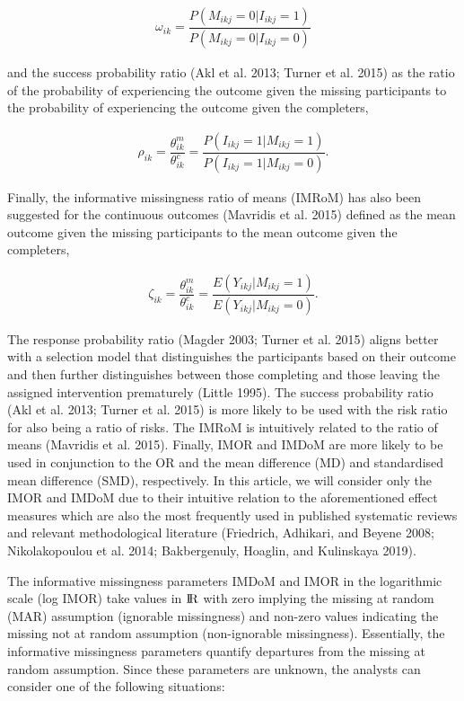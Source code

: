 \[\begin{aligned}
\omega_{ik} = \dfrac{P(M_{ikj} = 0 | I_{ikj} = 1)}{P(M_{ikj} = 0 | I_{ikj} = 0)}
\end{aligned}\]

and the success probability ratio (Akl et al. 2013; Turner et al. 2015) as the ratio of the
probability of experiencing the outcome given the missing participants to the
probability of experiencing the outcome given the completers,

\[\begin{aligned}
\rho_{ik} = \dfrac{\theta^{m}_{ik}}{\theta^{c}_{ik}} = \dfrac{P(I_{ikj} = 1 | M_{ikj} = 1)}{P(I_{ikj} = 1 | M_{ikj} = 0)}.
\end{aligned}\]

Finally, the informative missingness ratio of means (IMRoM) has also been suggested
for the continuous outcomes (Mavridis et al. 2015) defined as the mean outcome given the
missing participants to the mean outcome given the completers,

\[\begin{aligned}
\zeta_{ik} = \dfrac{\theta^{m}_{ik}}{\theta^{c}_{ik}} = \dfrac{E(Y_{ikj} | M_{ikj} = 1)}{E(Y_{ikj} | M_{ikj} = 0)}.
\end{aligned}\]

The response probability ratio (Magder 2003; Turner et al. 2015) aligns better with a
selection model that distinguishes the participants based on their outcome and
then further distinguishes between those completing and those leaving the assigned
intervention prematurely (Little 1995). The success probability ratio (Akl et al. 2013; Turner et al. 2015) is more likely to be used with the risk ratio for also being a ratio
of risks. The IMRoM is intuitively related to the ratio of means (Mavridis et al. 2015).
Finally, IMOR and IMDoM are more likely to be used in conjunction to the OR and
the mean difference (MD) and standardised mean difference (SMD), respectively.
In this article, we will consider only the IMOR and IMDoM due to their intuitive
relation to the aforementioned effect measures which are also the most frequently
used in published systematic reviews and relevant methodological literature
(Friedrich, Adhikari, and Beyene 2008; Nikolakopoulou et al. 2014; Bakbergenuly, Hoaglin, and Kulinskaya 2019).

The informative missingness parameters IMDoM and IMOR in the logarithmic scale
(log IMOR) take values in \({\rm I\!R}\) with zero implying the missing at random
(MAR) assumption (ignorable missingness) and non-zero values indicating the missing
not at random assumption (non-ignorable missingness). Essentially, the informative
missingness parameters quantify departures from the missing at random assumption.
Since these parameters are unknown, the analysts can consider one of the following
situations:

